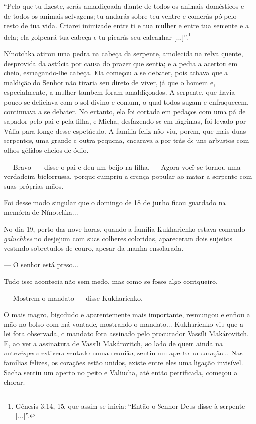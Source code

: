 ``Pelo que tu fizeste, serás amaldiçoada diante de todos os animais
domésticos e de todos os animais selvagens; tu andarás sobre teu ventre
e comerás pó pelo resto de tua vida. Criarei inimizade entre ti e tua
mulher e entre tua semente e a dela; ela golpeará tua cabeça e tu
picarás seu calcanhar {[}...{]}''.\footnote{Gênesis 3:14, 15, que assim
  se inicia: ``Então o Senhor Deus disse à serpente {[}...{]}''.}

Nínotchka atirou uma pedra na cabeça da serpente, amolecida na relva
quente, desprovida da astúcia por causa do prazer que sentia; e a pedra
a acertou em cheio, esmagando-lhe cabeça. Ela começou a se debater, pois
achava que a maldição do Senhor não tiraria seu direto de viver, já que
o homem e, especialmente, a mulher também foram amaldiçoados. A
serpente, que havia pouco se deliciava com o sol divino e comum, o qual
todos sugam e enfraquecem, continuava a se debater. No entanto, ela foi
cortada em pedaços com uma pá de sapador pelo pai e pela filha, e Micha,
desfazendo-se em lágrimas, foi levado por Vália para longe desse
espetáculo. A família feliz não viu, porém, que mais duas serpentes, uma
grande e outra pequena, encarava-a por trás de uns arbustos com olhos
gélidos cheios de ódio.

--- Bravo! --- disse o pai e deu um beijo na filha. --- Agora você se
tornou uma verdadeira bielorrussa, porque cumpriu a crença popular ao
matar a serpente com suas próprias mãos.

Foi desse modo singular que o domingo de 18 de junho ficou guardado na
memória de Nínotchka...

No dia 19, perto das nove horas, quando a família Kukharienko estava
comendo \emph{galuchkes} no desjejum com suas colheres coloridas,
apareceram dois sujeitos vestindo sobretudos de couro, apesar da manhã
ensolarada.

--- O senhor está preso...

Tudo isso acontecia não sem medo, mas como se fosse algo corriqueiro.

--- Mostrem o mandato --- disse Kukharienko.

O mais magro, bigodudo e aparentemente mais importante, resmungou e
enfiou a mão no bolso com má vontade, mostrando o mandato... Kukharienko
viu que a lei fora observada, o mandato fora assinado pelo procurador
Vassíli Makárovitch. E, ao ver a assinatura de Vassíli Makárovitch, аo
lado de quem ainda na antevéspera estivera sentado numa reunião, sentiu
um aperto no coração... Nas famílias felizes, os corações estão unidos,
existe entre eles uma ligação invisível. Sacha sentiu um aperto no peito
e Valiucha, até então petrificada, começou a chorar.

